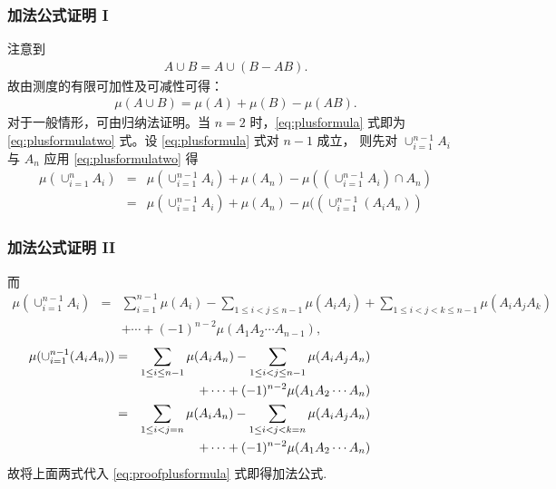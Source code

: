 \documentclass[Prob-All.tex]{subfiles}
\begin{document}
\begin{frame}%
	\frametitle{加法公式证明 I}
	注意到
	\begin{eqnarray*}
		A\cup B=A\cup (B-AB).
	\end{eqnarray*}
	\pause  故由测度的有限可加性及可减性可得：
	\begin{eqnarray*} \mu(A\cup B)=\mu(A)+\mu(B)-\mu(AB).
	\end{eqnarray*}
	\pause 对于一般情形，可由归纳法证明。当 $n=2$ 时，\eqref{eq:plusformula} 式即为
	\eqref{eq:plusformulatwo} 式。设 \eqref{eq:plusformula} 式对 $n-1$ 成立，
	则先对 $\cup_{i=1}^{n-1} A_i$ 与 $A_n$ 应用
	\eqref{eq:plusformulatwo} 得 \pause
	\begin{eqnarray}\label{eq:proofplusformula}
		\mu(\cup_{i=1}^nA_i)&=&\mu(\cup_{i=1}^{n-1}A_i)+\mu(A_n)-\mu((\cup_{i=1}^{n-1}A_i)\cap
		A_n)\nonumber\\
		&=&\mu(\cup_{i=1}^{n-1}A_i)+\mu(A_n)-\mu((\cup_{i=1}^{n-1}(A_iA_n))
	\end{eqnarray}
\end{frame}
\begin{frame}%
	\frametitle{加法公式证明 II}

	而{\small \begin{eqnarray*}
		\mu(\cup_{i=1}^{n-1}A_i)&=&\sum_{i=1}^{n-1}\mu(A_i)-\sum_{1\leq i<j\leq n-1}\mu(A_iA_j)+\sum_{1\leq i<j<k\leq n-1}\mu(A_iA_jA_k)\nonumber\\
		&&
		+\cdots+(-1)^{n-2}\mu(A_1A_2\cdots
		A_{n-1}),
	\end{eqnarray*}
	\pause
	\begin{eqnarray*}
		\hspace{-2cm} \mu(\cup_{i=1}^{n-1}(A_iA_n))&=&\sum_{1\leq i\leq n-1}\mu(A_iA_n)-\sum_{1\leq i<j\leq n-1}\mu(A_iA_jA_n)\\
		&& +\cdots+(-1)^{n-2}\mu(A_1A_2\cdots A_n)\\
		&=&\sum_{1\leq i<j=n}\mu(A_iA_n)-\sum_{1\leq i<j<k=n}\mu(A_iA_jA_n)\\
		&& +\cdots+(-1)^{n-2}\mu(A_1A_2\cdots A_n)
	\end{eqnarray*}}
	\pause 故将上面两式代入 \eqref{eq:proofplusformula} 式即得加法公式.
\end{frame}
\end{document}
